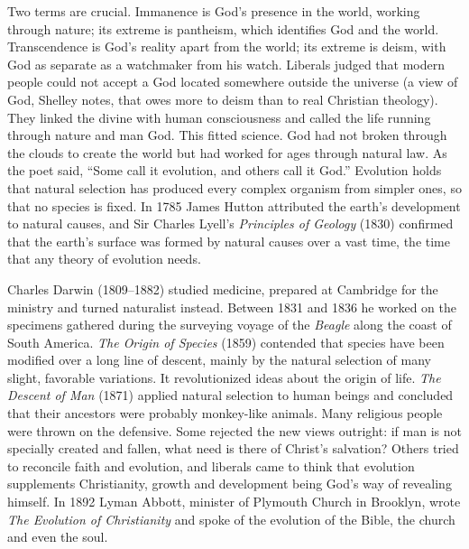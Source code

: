 Two terms are crucial. Immanence is God's presence in the world, working through nature; its extreme
is pantheism, which identifies God and the world. Transcendence is God's reality apart from the
world; its extreme is deism, with God as separate as a watchmaker from his watch. Liberals judged that modern people could not accept a God located somewhere outside the universe (a view of God, Shelley
notes, that owes more to deism than to real Christian theology). They linked the divine with human
consciousness and called the life running through nature and man God. This fitted science. God had
not broken through the clouds to create the world but had worked for ages through natural law. As
the poet said, ``Some call it evolution, and others call it God.'' Evolution holds that natural selection has produced every complex organism from simpler ones, so that no species
is fixed. In 1785 James Hutton attributed the earth's development to natural causes, and Sir Charles
Lyell's \emph{Principles of Geology} (1830) confirmed that the earth's surface was formed by natural
causes over a vast time, the time that any theory of evolution needs.

Charles Darwin (1809--1882) studied medicine, prepared at Cambridge for the ministry and turned naturalist instead. Between 1831 and 1836 he worked on the specimens gathered during the surveying voyage of the
\emph{Beagle} along the coast of South America. \emph{The Origin of Species} (1859) contended that
species have been modified over a long line of descent, mainly by the natural selection of
many slight, favorable variations. It revolutionized ideas about the origin of life. \emph{The
Descent of Man} (1871) applied natural selection to human beings and concluded that their ancestors
were probably monkey-like animals. Many religious people were thrown on the defensive. Some rejected
the new views outright: if man is not specially created and fallen, what need is there of Christ's
salvation? Others tried to reconcile faith and evolution, and liberals came to think that evolution
supplements Christianity, growth and development being God's way of revealing himself. In 1892 Lyman
Abbott, minister of Plymouth Church in Brooklyn, wrote \emph{The Evolution of Christianity} and spoke
of the evolution of the Bible, the church and even the soul.


